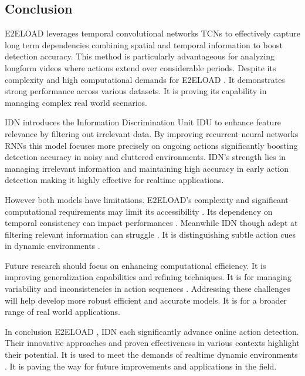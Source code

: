 {\subsection{Conclusion}
E2ELOAD leverages temporal convolutional networks TCNs to effectively capture long term dependencies combining spatial and temporal information to boost detection accuracy. This method is particularly advantageous for analyzing longform videos where actions extend over considerable periods. Despite its complexity and high computational demands  for E2ELOAD . It demonstrates strong performance across various datasets. It is proving its capability in managing complex real world scenarios.

IDN introduces the Information Discrimination Unit IDU to enhance feature relevance by filtering out irrelevant data. By improving recurrent neural networks RNNs this model focuses more precisely on ongoing actions significantly boosting detection accuracy in noisy and cluttered environments. IDN's strength lies in managing irrelevant information and maintaining high accuracy in early action detection making it highly effective for realtime applications.

However both models have limitations. E2ELOAD’s complexity and significant computational requirements may limit its accessibility . Its dependency on temporal consistency can impact performances .  Meanwhile IDN though adept at filtering relevant information can struggle . It is distinguishing subtle action cues in dynamic environments .

Future research should focus on enhancing computational efficiency.  It  is improving generalization capabilities and refining techniques. It is for managing variability and inconsistencies in action sequences . Addressing these challenges will help develop more robust efficient and accurate models.  It is  for a broader range of real world applications.

In conclusion E2ELOAD , IDN each significantly advance online action detection. Their innovative approaches and proven effectiveness in various contexts highlight their potential. It is used  to meet the demands of realtime dynamic environments . It is paving the way for future improvements and applications in the field.}